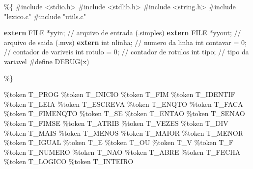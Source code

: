 \documentclass[
  brazilian,
  letterpaper,
]{book}
\newenvironment{Shaded}{\begin{snugshade}}{\end{snugshade}}
\newcommand{\CommentTok}[1]{\textcolor[rgb]{0.37,0.37,0.37}{#1}}
\newcommand{\DataTypeTok}[1]{\textcolor[rgb]{0.68,0.00,0.00}{#1}}
\newcommand{\DecValTok}[1]{\textcolor[rgb]{0.68,0.00,0.00}{#1}}
\newcommand{\ImportTok}[1]{\textcolor[rgb]{0.00,0.46,0.62}{#1}}
\newcommand{\KeywordTok}[1]{\textcolor[rgb]{0.00,0.23,0.31}{\textbf{#1}}}
\newcommand{\NormalTok}[1]{\textcolor[rgb]{0.00,0.23,0.31}{#1}}
\newcommand{\OperatorTok}[1]{\textcolor[rgb]{0.37,0.37,0.37}{#1}}
\newcommand{\PreprocessorTok}[1]{\textcolor[rgb]{0.68,0.00,0.00}{#1}}
\theoremstyle{plain}
\theoremstyle{definition}
\theoremstyle{remark}
\begin{document}
\begin{Shaded}
\begin{Highlighting}[]
\OperatorTok{\%\{}
\PreprocessorTok{\#include }\ImportTok{\textless{}stdio.h\textgreater{}}
\PreprocessorTok{\#include }\ImportTok{\textless{}stdlib.h\textgreater{}}
\PreprocessorTok{\#include }\ImportTok{\textless{}string.h\textgreater{}}
\PreprocessorTok{\#include }\ImportTok{"lexico.c"}
\PreprocessorTok{\#include }\ImportTok{"utils.c"}

\KeywordTok{extern} \DataTypeTok{FILE} \OperatorTok{*}\NormalTok{yyin}\OperatorTok{;}   \CommentTok{// arquivo de entrada (.simples)}
\KeywordTok{extern} \DataTypeTok{FILE} \OperatorTok{*}\NormalTok{yyout}\OperatorTok{;}  \CommentTok{// arquivo de saida (.mvs)}
\KeywordTok{extern} \DataTypeTok{int}\NormalTok{ nlinha}\OperatorTok{;}   \CommentTok{// numero da linha}
\DataTypeTok{int}\NormalTok{ contavar }\OperatorTok{=} \DecValTok{0}\OperatorTok{;}    \CommentTok{// contador de variveis}
\DataTypeTok{int}\NormalTok{ rotulo }\OperatorTok{=} \DecValTok{0}\OperatorTok{;}      \CommentTok{// contador de rotulos}
\DataTypeTok{int}\NormalTok{ tipo}\OperatorTok{;}            \CommentTok{// tipo da variavel}
\PreprocessorTok{\#define DEBUG}\OperatorTok{(}\PreprocessorTok{x}\OperatorTok{)}\PreprocessorTok{ }

\OperatorTok{\%\}}

\OperatorTok{\%}\NormalTok{token T\_PROG}
\OperatorTok{\%}\NormalTok{token T\_INICIO}
\OperatorTok{\%}\NormalTok{token T\_FIM}
\OperatorTok{\%}\NormalTok{token T\_IDENTIF}
\OperatorTok{\%}\NormalTok{token T\_LEIA}
\OperatorTok{\%}\NormalTok{token T\_ESCREVA}
\OperatorTok{\%}\NormalTok{token T\_ENQTO}
\OperatorTok{\%}\NormalTok{token T\_FACA}
\OperatorTok{\%}\NormalTok{token T\_FIMENQTO}
\OperatorTok{\%}\NormalTok{token T\_SE }
\OperatorTok{\%}\NormalTok{token T\_ENTAO}
\OperatorTok{\%}\NormalTok{token T\_SENAO}
\OperatorTok{\%}\NormalTok{token T\_FIMSE}
\OperatorTok{\%}\NormalTok{token T\_ATRIB}
\OperatorTok{\%}\NormalTok{token T\_VEZES}
\OperatorTok{\%}\NormalTok{token T\_DIV}
\OperatorTok{\%}\NormalTok{token T\_MAIS}
\OperatorTok{\%}\NormalTok{token T\_MENOS}
\OperatorTok{\%}\NormalTok{token T\_MAIOR}
\OperatorTok{\%}\NormalTok{token T\_MENOR}
\OperatorTok{\%}\NormalTok{token T\_IGUAL}
\OperatorTok{\%}\NormalTok{token T\_E }
\OperatorTok{\%}\NormalTok{token T\_OU}
\OperatorTok{\%}\NormalTok{token T\_V }
\OperatorTok{\%}\NormalTok{token T\_F }
\OperatorTok{\%}\NormalTok{token T\_NUMERO}
\OperatorTok{\%}\NormalTok{token T\_NAO }
\OperatorTok{\%}\NormalTok{token T\_ABRE}
\OperatorTok{\%}\NormalTok{token T\_FECHA}
\OperatorTok{\%}\NormalTok{token T\_LOGICO}
\OperatorTok{\%}\NormalTok{token T\_INTEIRO}


\end{Highlighting}
\end{Shaded}
\end{document}
